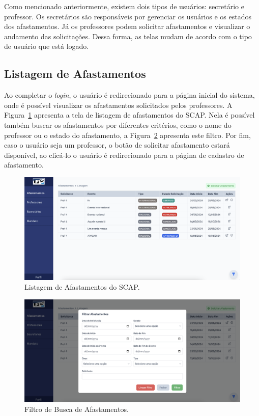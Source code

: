 Como mencionado anteriormente, existem dois tipos de usuários: secretário e professor. 
Os secretários são responsáveis por gerenciar os usuários e os estados dos afastamentos.
Já os professores podem solicitar afastamentos e visualizar o andamento das solicitações.
Dessa forma, as telas mudam de acordo com o tipo de usuário que está logado.

\FloatBarrier


\subsection{Listagem de Afastamentos}
\label{subsec-projeto-afastamentos}

Ao completar o \textit{login}, o usuário é redirecionado para a página inicial do sistema, onde é possível
visualizar os afastamentos solicitados pelos professores. A Figura~\ref{fig-listagem-afastamentos} apresenta a tela de listagem de afastamentos
do SCAP. Nela é possível também buscar os afastamentos por diferentes critérios, como o nome do professor ou o estado do afastamento,
a Figura~\ref{fig-filtro-afastamentos} apresenta este filtro. Por fim, caso o usuário seja um professor,
o botão de solicitar afastamento estará disponível, ao clicá-lo o usuário é redirecionado para a página de cadastro de afastamento.

\begin{figure}[h!]
    \centering
    \includegraphics[width=\textwidth]{figuras/prints-app/fig-lista-afastamento.png}
    \caption{Listagem de Afastamentos do SCAP.}
    \label{fig-listagem-afastamentos}
\end{figure}

\begin{figure}[h!]
    \centering
    \includegraphics[width=\textwidth]{figuras/prints-app/fig-filtro-afastamento.png}
    \caption{Filtro de Busca de Afastamentos.}
    \label{fig-filtro-afastamentos}
\end{figure}

